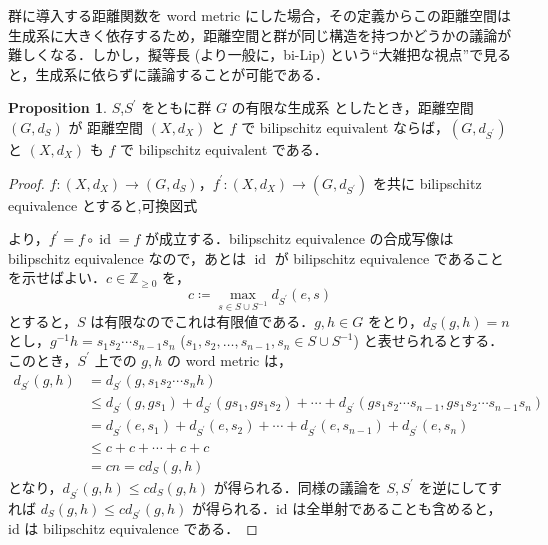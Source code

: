 \documentclass[dvipdfmx]{ujarticle}
\DeclareMathOperator{\id}{id}
\theoremstyle{definition}
\newtheorem{prop}[dfn]{Proposition}
\begin{document}
群に導入する距離関数を word metric にした場合，その定義からこの距離空間は生成系に大きく依存するため，距離空間と群が同じ構造を持つかどうかの議論が難しくなる．しかし，擬等長 (より一般に，bi-Lip) という``大雑把な視点''で見ると，生成系に依らずに議論することが可能である．

\begin{prop}\label{Sprime}
  $S$,$S^\prime$ をともに群 $G$ の有限な生成系 としたとき，距離空間 $(G,d_S)$ が 距離空間 $(X,d_X)$ と $f$ で bilipschitz equivalent ならば，$(G,d_{S^\prime})$ と $(X,d_X)$ も $f$ で bilipschitz equivalent である．
\end{prop}

\begin{proof}
$f \colon (X,d_X)\rightarrow (G,d_S)$，$f^\prime\colon (X,d_X)\rightarrow (G,d_{S^\prime})$ を共に bilipschitz equivalence とすると,可換図式
\begin{center}
\end{center}
より，$f^\prime=f\circ\id=f$ が成立する．bilipschitz equivalence の合成写像は bilipschitz equivalence なので，あとは $\id$ が bilipschitz equivalence であることを示せばよい．$c\in\mathbb{Z}_{\geq 0}$ を，
$$c\coloneqq\underset{s\in S\cup S^{-1}}{\max}d_{S^\prime}(e,s)$$
とすると，$S$ は有限なのでこれは有限値である．$g,h\in G$ をとり，$d_S(g,h)=n$ とし，$g^{-1}h=s_1s_2\cdots s_{n-1} s_n$ ($s_1,s_2,\ldots,s_{n-1},s_n\in S\cup S^{-1}$) と表せられるとする．このとき，$S^\prime$ 上での $g,h$ の word metric は，
\begin{align*}
  d_{S^\prime}(g,h)&=d_{S^\prime}(g,s_1s_2\cdots s_nh)\\
  &\leq d_{S^\prime}(g,gs_1)+d_{S^\prime}(gs_1,gs_1s_2)+\cdots+d_{S^\prime}(gs_1s_2\cdots s_{n-1},gs_1s_2\cdots s_{n-1}s_n)\\
  &=d_{S^\prime}(e,s_1)+d_{S^\prime}(e,s_2)+\cdots+d_{S^\prime}(e,s_{n-1})+d_{S^\prime}(e,s_n)\\
  &\leq c+c+\cdots+c+c\\
  &=cn=cd_S(g,h)
\end{align*}
となり，$d_{S^\prime}(g,h)\leq cd_S(g,h)$ が得られる．同様の議論を $S,S^\prime$ を逆にしてすれば $d_S(g,h)\leq cd_{S^\prime}(g,h)$ が得られる．id は全単射であることも含めると，id は bilipschitz equivalence である．
\end{proof}
\end{document}
